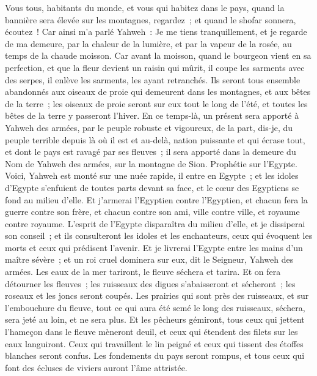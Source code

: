 \begin{multicols}{2}
Vous tous, habitants du monde, et vous qui habitez dans le pays, quand la bannière sera élevée sur les montagnes, regardez~; et quand le shofar sonnera, écoutez~!
Car ainsi m'a parlé Yahweh~: Je me tiens tranquillement, et je regarde de ma demeure, par la chaleur de la lumière, et par la vapeur de la rosée, au temps de la chaude moisson.
Car avant la moisson, quand le bourgeon vient en sa perfection, et que la fleur devient un raisin qui mûrit, il coupe les sarments avec des serpes, il enlève les sarments, les ayant retranchés.
Ils seront tous ensemble abandonnés aux oiseaux de proie qui demeurent dans les montagnes, et aux bêtes de la terre~; les oiseaux de proie seront sur eux tout le long de l'été, et toutes les bêtes de la terre y passeront l'hiver.
En ce temps-là, un présent sera apporté à Yahweh des armées, par le peuple robuste et vigoureux, de la part, dis-je, du peuple terrible depuis là où il est et au-delà, nation puissante et qui écrase tout, et dont le pays est ravagé par ses fleuves~; il sera apporté dans la demeure du Nom de Yahweh des armées, sur la montagne de Sion.
\VerseOne{}Prophétie sur l'Egypte. Voici, Yahweh est monté sur une nuée rapide, il entre en Egypte~; et les idoles d'Egypte s'enfuient de toutes parts devant sa face, et le cœur des Egyptiens se fond au milieu d'elle.
Et j'armerai l'Egyptien contre l'Egyptien, et chacun fera la guerre contre son frère, et chacun contre son ami, ville contre ville, et royaume contre royaume.
L'esprit de l'Egypte disparaîtra du milieu d'elle, et je dissiperai son conseil~; et ils consulteront les idoles et les enchanteurs, ceux qui évoquent les morts et ceux qui prédisent l'avenir.
Et je livrerai l'Egypte entre les mains d'un maître sévère~; et un roi cruel dominera sur eux, dit le Seigneur, Yahweh des armées.
Les eaux de la mer tariront, le fleuve séchera et tarira.
Et on fera détourner les fleuves~; les ruisseaux des digues s'abaisseront et sécheront~; les roseaux et les joncs seront coupés.
Les prairies qui sont près des ruisseaux, et sur l'embouchure du fleuve, tout ce qui aura été semé le long des ruisseaux, séchera, sera jeté au loin, et ne sera plus.
Et les pêcheurs gémiront, tous ceux qui jettent l'hameçon dans le fleuve mèneront deuil, et ceux qui étendent des filets sur les eaux languiront.
Ceux qui travaillent le lin peigné et ceux qui tissent des étoffes blanches seront confus.
Les fondements du pays seront rompus, et tous ceux qui font des écluses de viviers auront l'âme attristée.

\end{multicols}
